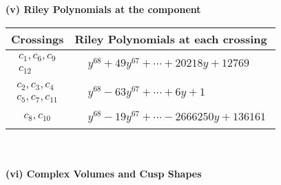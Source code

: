 \documentclass[1p]{elsarticle_modified}
\theoremstyle{definition}
\begin{document}
\newpage\renewcommand{\arraystretch}{1}
\flushleft \textbf{(v) Riley Polynomials at the component}\newline \\
\begin{tabular}{m{50pt}|m{274pt}}
Crossings & \hspace{64pt}Riley Polynomials at each crossing \\
\hline $$\begin{aligned}c_{1},c_{6},c_{9}\\c_{12}\end{aligned}$$&$\begin{aligned}
&y^{68}+49 y^{67}+\cdots+20218 y+12769
\end{aligned}$\\
\hline $$\begin{aligned}c_{2},c_{3},c_{4}\\c_{5},c_{7},c_{11}\end{aligned}$$&$\begin{aligned}
&y^{68}-63 y^{67}+\cdots+6 y+1
\end{aligned}$\\
\hline $$\begin{aligned}c_{8},c_{10}\end{aligned}$$&$\begin{aligned}
&y^{68}-19 y^{67}+\cdots-2666250 y+136161
\end{aligned}$\\
\hline
\end{tabular}\\~\\
\newpage\flushleft \textbf{(vi) Complex Volumes and Cusp Shapes}
\end{document}
